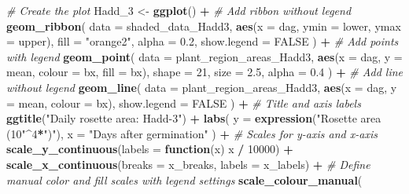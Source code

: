 \documentclass[
  11pt,
]{article}
\newenvironment{Shaded}{\begin{snugshade}}{\end{snugshade}}
\newcommand{\AttributeTok}[1]{\textcolor[rgb]{0.13,0.29,0.53}{#1}}
\newcommand{\CommentTok}[1]{\textcolor[rgb]{0.56,0.35,0.01}{\textit{#1}}}
\newcommand{\ConstantTok}[1]{\textcolor[rgb]{0.56,0.35,0.01}{#1}}
\newcommand{\ControlFlowTok}[1]{\textcolor[rgb]{0.13,0.29,0.53}{\textbf{#1}}}
\newcommand{\DecValTok}[1]{\textcolor[rgb]{0.00,0.00,0.81}{#1}}
\newcommand{\FloatTok}[1]{\textcolor[rgb]{0.00,0.00,0.81}{#1}}
\newcommand{\FunctionTok}[1]{\textcolor[rgb]{0.13,0.29,0.53}{\textbf{#1}}}
\newcommand{\NormalTok}[1]{#1}
\newcommand{\OtherTok}[1]{\textcolor[rgb]{0.56,0.35,0.01}{#1}}
\newcommand{\SpecialCharTok}[1]{\textcolor[rgb]{0.81,0.36,0.00}{\textbf{#1}}}
\newcommand{\StringTok}[1]{\textcolor[rgb]{0.31,0.60,0.02}{#1}}
\begin{document}
\begin{Shaded}
\begin{Highlighting}[]
\CommentTok{\# Create the plot}
\NormalTok{Hadd\_3 }\OtherTok{\textless{}{-}} \FunctionTok{ggplot}\NormalTok{() }\SpecialCharTok{+}
  \CommentTok{\# Add ribbon without legend}
  \FunctionTok{geom\_ribbon}\NormalTok{(}
    \AttributeTok{data =}\NormalTok{ shaded\_data\_Hadd3,}
    \FunctionTok{aes}\NormalTok{(}\AttributeTok{x =}\NormalTok{ dag, }\AttributeTok{ymin =}\NormalTok{ lower, }\AttributeTok{ymax =}\NormalTok{ upper),}
    \AttributeTok{fill =} \StringTok{"orange2"}\NormalTok{, }\AttributeTok{alpha =} \FloatTok{0.2}\NormalTok{,}
    \AttributeTok{show.legend =} \ConstantTok{FALSE}
\NormalTok{  ) }\SpecialCharTok{+}
  \CommentTok{\# Add points with legend}
  \FunctionTok{geom\_point}\NormalTok{(}
    \AttributeTok{data =}\NormalTok{ plant\_region\_areas\_Hadd3,}
    \FunctionTok{aes}\NormalTok{(}\AttributeTok{x =}\NormalTok{ dag, }\AttributeTok{y =}\NormalTok{ mean, }\AttributeTok{colour =}\NormalTok{ bx, }\AttributeTok{fill =}\NormalTok{ bx),}
    \AttributeTok{shape =} \DecValTok{21}\NormalTok{, }\AttributeTok{size =} \FloatTok{2.5}\NormalTok{, }\AttributeTok{alpha =} \FloatTok{0.4}
\NormalTok{  ) }\SpecialCharTok{+}
  \CommentTok{\# Add line without legend}
  \FunctionTok{geom\_line}\NormalTok{(}
    \AttributeTok{data =}\NormalTok{ plant\_region\_areas\_Hadd3,}
    \FunctionTok{aes}\NormalTok{(}\AttributeTok{x =}\NormalTok{ dag, }\AttributeTok{y =}\NormalTok{ mean, }\AttributeTok{colour =}\NormalTok{ bx),}
    \AttributeTok{show.legend =} \ConstantTok{FALSE}
\NormalTok{  ) }\SpecialCharTok{+}
  \CommentTok{\# Title and axis labels}
  \FunctionTok{ggtitle}\NormalTok{(}\StringTok{"Daily rosette area: Hadd{-}3"}\NormalTok{) }\SpecialCharTok{+}
  \FunctionTok{labs}\NormalTok{(}
    \AttributeTok{y =} \FunctionTok{expression}\NormalTok{(}\StringTok{"Rosette area (10"}\SpecialCharTok{\^{}}\DecValTok{4}\SpecialCharTok{*}\StringTok{")"}\NormalTok{), }
    \AttributeTok{x =} \StringTok{"Days after germination"}
\NormalTok{  ) }\SpecialCharTok{+}
  \CommentTok{\# Scales for y{-}axis and x{-}axis}
  \FunctionTok{scale\_y\_continuous}\NormalTok{(}\AttributeTok{labels =} \ControlFlowTok{function}\NormalTok{(x) x }\SpecialCharTok{/} \DecValTok{10000}\NormalTok{) }\SpecialCharTok{+}
  \FunctionTok{scale\_x\_continuous}\NormalTok{(}\AttributeTok{breaks =}\NormalTok{ x\_breaks, }\AttributeTok{labels =}\NormalTok{ x\_labels) }\SpecialCharTok{+}
  \CommentTok{\# Define manual color and fill scales with legend settings}
  \FunctionTok{scale\_colour\_manual}\NormalTok{(}

\end{Highlighting}
\end{Shaded}
\end{document}
